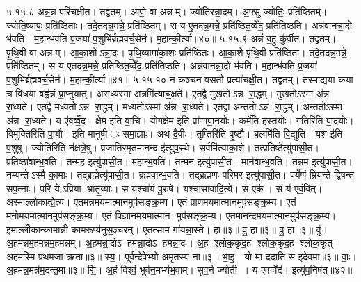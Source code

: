 ५.१५.८
अन्न॒न्न परि॑चक्षीत। तद्व्र॒तम्। आपो॒ वा अन्नम्। ज्योति॑रन्ना॒दम्। अ॒फ्सु ज्योतिः॒ प्रति॑ष्ठितम्। ज्योति॒ष्यापः॒ प्रति॑ष्ठिताः। तदे॒तदन्न॒मन्ने॒ प्रति॑ष्ठितम्। स य ए॒तदन्न॒मन्ने॒ प्रति॑ष्ठित॒व्वेँद॒ प्रति॑तिष्ठति। अन्न॑वानन्ना॒दो भ॑वति। म॒हान्भ॑वति प्र॒जया॑ प॒शुभि॑र्ब्रह्मवर्च॒सेन॑। म॒हान्की॒र्त्या॥४०॥
५.१५.९
अन्नं॑ ब॒हु कु॑र्वीत। तद्व्र॒तम्। पृ॒थि॒वी वा अन्नम्। आ॒का॒शोऽन्ना॒दः। पृ॒थि॒व्यामा॑का॒शः प्रति॑ष्ठितः। आ॒का॒शे पृ॑थि॒वी प्रति॑ष्ठिता। तदे॒तदन्न॒मन्ने॒ प्रति॑ष्ठितम्। स य ए॒तदन्न॒मन्ने॒ प्रति॑ष्ठित॒व्वेँद॒ प्रति॑तिष्ठति। अन्न॑वानन्ना॒दो भ॑वति। म॒हान्भ॑वति प्र॒जया॑ प॒शुभि॑र्ब्रह्मवर्च॒सेन॑। म॒हान्की॒र्त्या॥४१॥
५.१५.१०
न कञ्चन वसतौ प्रत्या॑चक्षी॒त। तद्व्र॒तम्। तस्माद्यया कया च विधया बह्व॑न्नं प्रा॒प्नुयात्। अराध्यस्मा अन्नमि॑त्याच॒क्षते। एतद्वै मुखतोऽन्न रा॒द्धम्। मुखतोऽस्मा अ॑न्न रा॒ध्यते। एतद्वै मध्यतोऽन्न रा॒द्धम्। मध्यतोऽस्मा अ॑न्न रा॒ध्यते। एतद्वा अन्ततोऽन्न रा॒द्धम्। अन्ततोऽस्मा अ॑न्न रा॒ध्यते। य ए॑वव्वेँ॒द। क्षेम इ॑ति वा॒चि। योगक्षेम इति प्रा॑णापा॒नयोः। कर्मे॑ति ह॒स्तयोः। गतिरि॑ति पा॒दयोः। विमुक्तिरि॑ति पा॒यौ। इति मानुषीः समा॒ज्ञाः। अथ दै॒वीः। तृप्तिरि॑ति वृ॒ष्टौ। बलमि॑ति वि॒द्युति। यश इ॑ति प॒शुषु। ज्योतिरिति न॑क्षत्रे॒षु। प्रजातिरमृतमानन्द इ॑त्युप॒स्थे। सर्वमि॑त्याका॒शे। तत्प्रतिष्ठेत्यु॑पासी॒त। प्रतिष्ठा॑वान्भ॒वति। तन्मह इत्यु॑पासी॒त। म॑हान्भ॒वति। तन्मन इत्यु॑पासी॒त। मान॑वान्भ॒वति। तन्नम इत्यु॑पासी॒त। नम्यन्तेऽस्मै का॒माः। तद्ब्रह्मेत्यु॑पासी॒त। ब्रह्म॑वान्भ॒वति। तद्ब्रह्मणः परिमर इत्यु॑पासी॒त। पर्येणं म्रियन्ते द्विषन्त॑ सप॒त्नाः। परि येऽप्रिया भ्रातृ॒व्याः। स यश्चा॑यं पु॒रुषे। यश्चासा॑वादि॒त्ये। स एक॑। स य॑ एवं॒वित्। अस्माल्लो॑कात्प्रे॒त्य। एतमन्नमयमात्मानमुप॑सङ्क्र॒म्य। एतं प्राणमयमात्मानमुप॑सङ्क्र॒म्य। एतं मनोमयमात्मानमुप॑सङ्क्र॒म्य। एतं विज्ञानमयमात्मान- मुप॑सङ्क्र॒म्य। एतमानन्दमयमात्मानमुप॑सङ्क्र॒म्य। इमाल्लोँकान्कामान्नी कामरूप्य॑नुस॒ञ्चरन्। एतत्साम गा॑यन्ना॒स्ते। हा॥३॥ वु॒ हा॥३॥ वु॒ हा॥३॥ वु॑। अ॒हमन्नम॒हमन्नम॒हमन्नम्। अ॒हमन्ना॒दोऽ हमन्ना॒दोऽ हमन्ना॒दः। अ॒ह श्लोक॒कृद॒ह श्लोक॒कृद॒ह श्लोक॒कृत्। अहमस्मि प्रथमजा ऋता॥३॥ स्य॒। पूर्वन्देवेभ्यो अमृतस्य ना॥३॥ भा॒इ॒। यो मा ददाति स इदेवमा॥३॥ वाः॒। अ॒हमन्न॒मन्न॑म॒दन्त॒मा॥३॥ द्मि॒। अ॒हं  विश्वं॒ भुव॑न॒मभ्य॑भ॒वाम्। सुव॒र्न ज्योती। य ए॒वव्वेँद॑। इत्यु॑प॒निष॑त्॥४२॥

